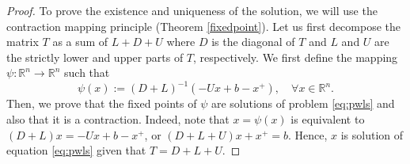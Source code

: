 \documentclass[11pt]{article}
\newcommand{\R}{\mathbb R}
\begin{document}
\begin{proof}

To prove the existence and uniqueness of the solution, we will use the contraction mapping principle (Theorem \ref{fixedpoint}). Let us first decompose the matrix $T$ as a sum of $L+D+U$ where $D$ is the diagonal of $T$ and $L$ and $U$ are the strictly lower and upper parts of $T$, respectively.  We first define the mapping $\psi:\R^n\to \R^n$ such that 
$$ \psi(x) := (D+L)^{-1}(-Ux+b-x^+), \quad \forall x \in \R^n.$$
Then, we prove that the fixed points of $\psi$ are solutions of problem \eqref{eq:pwls} and also that it is a contraction. Indeed, note that $x=\psi(x)$ is equivalent to $(D+L)x=-Ux+b-x^+$, or $(D+L+U)x+x^{+}=b$. Hence, $x$ is solution of equation \eqref{eq:pwls} given that $T=D+L+U$.


\end{proof}
\end{document}
